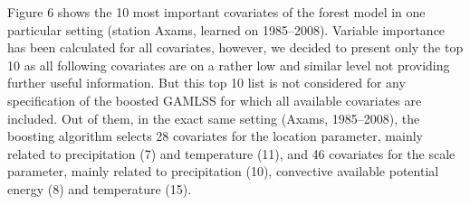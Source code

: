 \documentclass[american,foldmarks=false,noconfig]{uibklttr}
\begin{document}
Figure 6 shows the 10 most important covariates of the forest model
in one particular setting (station Axams, learned on 1985--2008). 
Variable importance has been calculated for all covariates, however,
we decided to present only the top 10 as all following covariates 
are on a rather low and similar level not providing further useful
information. But this top 10 list is not considered for any 
specification of the boosted GAMLSS for which all available 
covariates are included. Out of them, in the exact same setting 
(Axams, 1985--2008), the boosting algorithm selects 28 covariates 
for the location parameter, mainly related to precipitation (7) 
and temperature (11), and 46 covariates for the scale parameter, 
mainly related to precipitation (10), convective available potential 
energy (8) and temperature (15).


\end{document}
